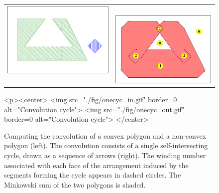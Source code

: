 \begin{figure}[t]
  \begin{ccTexOnly}
    \begin{center}
      \begin{tabular}{c c}
        \includegraphics{Minkowski_sum_2/fig/onecyc_in} ~&~
        \includegraphics{Minkowski_sum_2/fig/onecyc_out}
      \end{tabular}
    \end{center}
  \end{ccTexOnly}
  \begin{ccHtmlOnly}
    <p><center>
    <img src="./fig/onecyc_in.gif" border=0 alt="Convolution cycle">
    <img src="./fig/onecyc_out.gif" border=0 alt="Convolution cycle">
    </center>
  \end{ccHtmlOnly}
\caption{Computing the convolution of a convex polygon and a
non-convex polygon (left). The convolution consists of a single
self-intersecting cycle, drawn as a sequence of arrows (right).
The winding number associated with each face of the arrangement
induced by the segments forming the cycle appears in dashed circles.
The Minkowski sum of the two polygons is shaded.}
\label{mink_fig:onecyc}
\end{figure}

